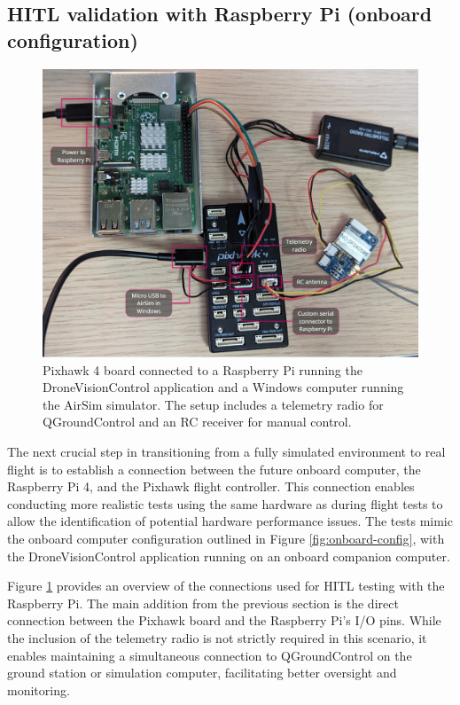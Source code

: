 \subsection{HITL validation with Raspberry Pi (onboard configuration)}
\label{sec:test-5-rpi}

\begin{figure}[H]
  \centering
  \includegraphics[width=\textwidth, keepaspectratio]{img/hitl-setup-picture.jpg}
  \caption{Pixhawk 4 board connected to a Raspberry Pi running the DroneVisionControl application and a Windows computer running the AirSim simulator. The setup includes a telemetry radio for QGroundControl and an RC receiver for manual control.}
  \label{fig:hitl-setup-picture}
\end{figure}

The next crucial step in transitioning from a fully simulated environment to real flight is to establish a connection between the future onboard computer, the Raspberry Pi 4, and the Pixhawk flight controller. This connection enables conducting more realistic tests using the same hardware as during flight tests to allow the identification of potential hardware performance issues. The tests mimic the onboard computer configuration outlined in Figure \ref{fig:onboard-config}, with the DroneVisionControl application running on an onboard companion computer.

Figure \ref{fig:hitl-setup-picture} provides an overview of the connections used for HITL testing with the Raspberry Pi. The main addition from the previous section is the direct connection between the Pixhawk board and the Raspberry Pi's I/O pins. While the inclusion of the telemetry radio is not strictly required in this scenario, it enables maintaining a simultaneous connection to QGroundControl on the ground station or simulation computer, facilitating better oversight and monitoring.

